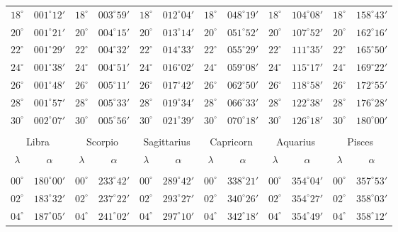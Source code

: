 \begin{table}[!h]
{\begin{tabular}{cc|cc|cc|cc|cc|cc}
$18^\circ$ & $001^\circ12'$ & $18^\circ$ & $003^\circ59'$ & $18^\circ$ & $012^\circ04'$ & $18^\circ$ & $048^\circ19'$ & $18^\circ$ & $104^\circ08'$ & $18^\circ$ & $158^\circ43'$\\
$20^\circ$ & $001^\circ21'$ & $20^\circ$ & $004^\circ15'$ & $20^\circ$ & $013^\circ14'$ & $20^\circ$ & $051^\circ52'$ & $20^\circ$ & $107^\circ52'$ & $20^\circ$ & $162^\circ16'$\\
$22^\circ$ & $001^\circ29'$ & $22^\circ$ & $004^\circ32'$ & $22^\circ$ & $014^\circ33'$ & $22^\circ$ & $055^\circ29'$ & $22^\circ$ & $111^\circ35'$ & $22^\circ$ & $165^\circ50'$\\
$24^\circ$ & $001^\circ38'$ & $24^\circ$ & $004^\circ51'$ & $24^\circ$ & $016^\circ02'$ & $24^\circ$ & $059^\circ08'$ & $24^\circ$ & $115^\circ17'$ & $24^\circ$ & $169^\circ22'$\\
$26^\circ$ & $001^\circ48'$ & $26^\circ$ & $005^\circ11'$ & $26^\circ$ & $017^\circ42'$ & $26^\circ$ & $062^\circ50'$ & $26^\circ$ & $118^\circ58'$ & $26^\circ$ & $172^\circ55'$\\
$28^\circ$ & $001^\circ57'$ & $28^\circ$ & $005^\circ33'$ & $28^\circ$ & $019^\circ34'$ & $28^\circ$ & $066^\circ33'$ & $28^\circ$ & $122^\circ38'$ & $28^\circ$ & $176^\circ28'$\\
$30^\circ$ & $002^\circ07'$ & $30^\circ$ & $005^\circ56'$ & $30^\circ$ & $021^\circ39'$ & $30^\circ$ & $070^\circ18'$ & $30^\circ$ & $126^\circ18'$ & $30^\circ$ & $180^\circ00'$\\
\multicolumn{12}{c}{}\\
\multicolumn{2}{c}{Libra}\vline & \multicolumn{2}{c}{Scorpio} \vline& \multicolumn{2}{c}{Sagittarius} \vline& \multicolumn{2}{c}{Capricorn}\vline &
\multicolumn{2}{c}{Aquarius}\vline & \multicolumn{2}{c}{Pisces}\\\hline
$\lambda$& $\alpha$& $\lambda$& $\alpha$& $\lambda$& $\alpha$& $\lambda$& $\alpha$& $\lambda$& $\alpha$& $\lambda$& $\alpha$\\\hline
&&&&&&&&&&&\\[-2ex]
$00^\circ$ & $180^\circ00'$ & $00^\circ$ & $233^\circ42'$ & $00^\circ$ & $289^\circ42'$ & $00^\circ$ & $338^\circ21'$ &  $00^\circ$ & $354^\circ04'$ & $00^\circ$ & $357^\circ53'$\\
$02^\circ$ & $183^\circ32'$ & $02^\circ$ & $237^\circ22'$ & $02^\circ$ & $293^\circ27'$ & $02^\circ$ & $340^\circ26'$ &  $02^\circ$ & $354^\circ27'$ & $02^\circ$ & $358^\circ03'$\\
$04^\circ$ & $187^\circ05'$ & $04^\circ$ & $241^\circ02'$ & $04^\circ$ & $297^\circ10'$ & $04^\circ$ & $342^\circ18'$ &  $04^\circ$ & $354^\circ49'$ & $04^\circ$ & $358^\circ12'$\\

\end{tabular}}
\end{table}
